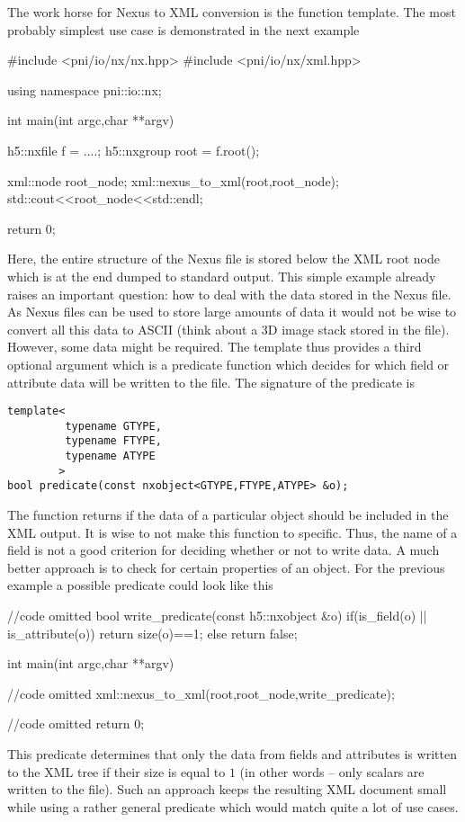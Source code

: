 The work horse for Nexus to XML conversion is the  function
template. The most probably simplest use case is demonstrated in the next
example 
\begin{cppcode}
#include <pni/io/nx/nx.hpp>
#include <pni/io/nx/xml.hpp>

using namespace pni::io::nx;

int main(int argc,char **argv)
{
    h5::nxfile f = ....;
    h5::nxgroup root = f.root();

    xml::node root_node;
    xml::nexus_to_xml(root,root_node);
    std::cout<<root_node<<std::endl;

    return 0;
}
\end{cppcode}
Here, the entire structure of the Nexus file is stored below the XML root node 
which is at the end dumped to standard output.
This simple example already raises an important question: how to deal with the
data stored in the Nexus file. As Nexus files can be used to store large amounts
of data it would not be wise to convert all this data to ASCII (think about a 3D
image stack stored in the file). However, some data might be required. 
The  template thus provides a third optional argument which 
is a predicate function which decides for which field or attribute data will be
written to the file. 
The signature of the predicate is 
\begin{verbatim}
template<
         typename GTYPE,
         typename FTYPE,
         typename ATYPE
        >
bool predicate(const nxobject<GTYPE,FTYPE,ATYPE> &o);
\end{verbatim}
The function returns  if the data of a particular object should be 
included in the XML output. 
It is wise to not make this function to specific. Thus, the name of a field 
is not a good criterion for deciding whether or not to write data. 
A much better approach is to check for certain properties of an object. 
For the previous example a possible predicate could look like this
\begin{cppcode}
//code omitted 
bool write_predicate(const h5::nxobject &o)
{
    if(is_field(o) || is_attribute(o))
    {
       return size(o)==1;
    }
    else 
        return false;
}

int main(int argc,char **argv)
{
    //code omitted 
    xml::nexus_to_xml(root,root_node,write_predicate);

    //code omitted
    return 0;
}
\end{cppcode}
This predicate determines that only the data from fields and attributes 
is written to the XML tree if their size is equal to $1$ (in other words -- only
scalars are written to the file). 
Such an approach keeps the resulting XML document small while using a rather 
general predicate which would match quite a lot of use cases.

